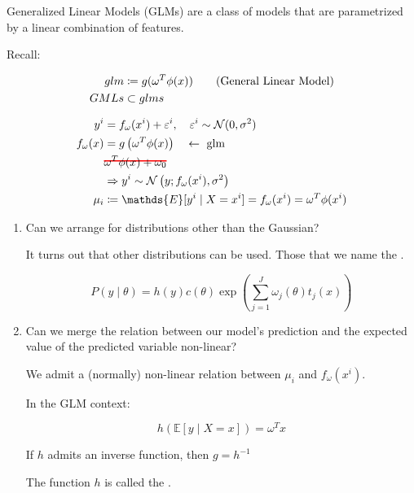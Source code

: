 Generalized Linear Models (GLMs) are a class of models that are
parametrized by a linear combination of features.

Recall:

\begin{align*}
	glm  & \coloneqq g(\omega^T\phi(x))  \tag{\text{General Linear Model}} \\
	GMLs & \subset glms
\end{align*}

\newcommand\hcancel[2][black]{\setbox0=\hbox{$#2$}%
	\rlap{\raisebox{.45\ht0}{\textcolor{#1}{\rule{\wd0}{1pt}}}}#2}


\begin{align*}
	y^i         & = f_\omega(x^i) + \varepsilon^i, \quad \varepsilon^i \sim \mathcal{N}(0, \sigma^2) \\
	f_\omega(x) & = g\left(\omega^T\phi(x)\right) \quad \leftarrow \text{ glm}                       \\
	            & \hcancel[red]{\omega^T\phi(x) + \omega_0}                                          \\
	            & \Rightarrow y^i \sim \mathcal{N}\left(y; f_\omega(x^i), \sigma^2\right)            \\
	\mu_i       & \coloneqq \mathds{E}[y^i  \mid X = x^i] = f_\omega(x^i) = \omega^T\phi(x^i)
\end{align*}

\begin{enumerate}
	\item Can we arrange for distributions other than the Gaussian?

	      It turns out that other distributions can be used. Those that
	      we name the .

	      \begin{equation*}
		      P(y \mid \theta) = h(y)c(\theta) \exp\left(\sum_{j=1}^J \omega_j(\theta)t_j(x)\right)
	      \end{equation*}

	\item Can we merge the relation between our model's prediction
	      and the expected value of the predicted variable non-linear?

	      We admit a (normally) non-linear relation between $\mu_i$ and $f_\omega(x^i)$.

	      In the GLM context:

	      \begin{equation*}
		      \boxed{
			      h\left(\mathds{E} [y \mid X = x] \right) = \omega^T x
		      }
	      \end{equation*}

	      If $h$ admits an inverse function, then $g = h^{-1}$

	      The function $h$ is called the .

\end{enumerate}

